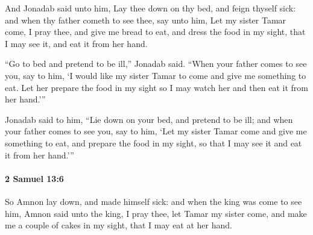 			\begin{versebox}
					\item[BHS] 
					\item[ASV] And Jonadab said unto him, Lay thee down on thy bed, and feign thyself sick: and when thy father cometh to see thee, say unto him, Let my sister Tamar come, I pray thee, and give me bread to eat, and dress the food in my sight, that I may see it, and eat it from her hand.
					\item[NIV] “Go to bed and pretend to be ill,” Jonadab said. “When your father comes to see you, say to him, ‘I would like my sister Tamar to come and give me something to eat. Let her prepare the food in my sight so I may watch her and then eat it from her hand.’”
					\item[NRSV] Jonadab said to him, “Lie down on your bed, and pretend to be ill; and when your father comes to see you, say to him, ‘Let my sister Tamar come and give me something to eat, and prepare the food in my sight, so that I may see it and eat it from her hand.’”
			\end{versebox}

		\paragraph{2 Samuel 13:6} %
			\label{2SAMUEL-13-6}

			So Amnon lay down, and made himself sick: and when the king was come to see him, Amnon said unto the king, I pray thee, let Tamar my sister come, and make me a couple of cakes in my sight, that I may eat at her hand.

